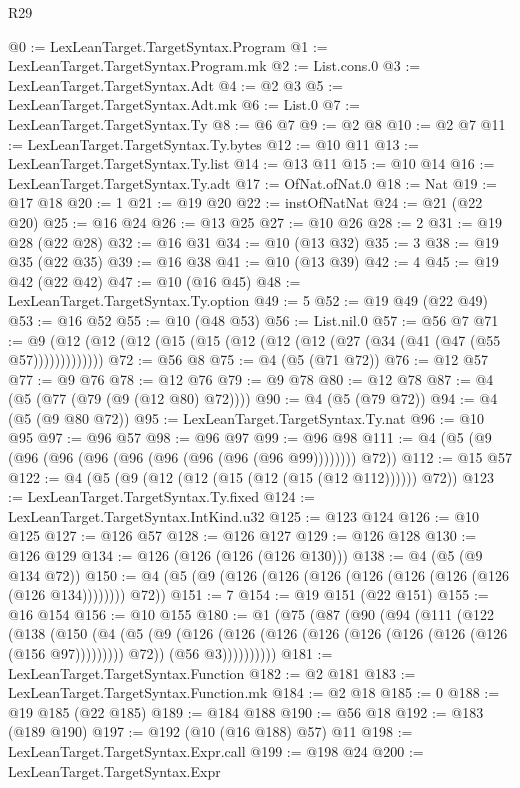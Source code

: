 \begin{lexlean}{R29}
\begin{coremodule}
@0 := LexLeanTarget.TargetSyntax.Program
@1 := LexLeanTarget.TargetSyntax.Program.mk
@2 := List.cons.{0}
@3 := LexLeanTarget.TargetSyntax.Adt
@4 := @2 @3
@5 := LexLeanTarget.TargetSyntax.Adt.mk
@6 := List.{0}
@7 := LexLeanTarget.TargetSyntax.Ty
@8 := @6 @7
@9 := @2 @8
@10 := @2 @7
@11 := LexLeanTarget.TargetSyntax.Ty.bytes
@12 := @10 @11
@13 := LexLeanTarget.TargetSyntax.Ty.list
@14 := @13 @11
@15 := @10 @14
@16 := LexLeanTarget.TargetSyntax.Ty.adt
@17 := OfNat.ofNat.{0}
@18 := Nat
@19 := @17 @18
@20 := 1
@21 := @19 @20
@22 := instOfNatNat
@24 := @21 (@22 @20)
@25 := @16 @24
@26 := @13 @25
@27 := @10 @26
@28 := 2
@31 := @19 @28 (@22 @28)
@32 := @16 @31
@34 := @10 (@13 @32)
@35 := 3
@38 := @19 @35 (@22 @35)
@39 := @16 @38
@41 := @10 (@13 @39)
@42 := 4
@45 := @19 @42 (@22 @42)
@47 := @10 (@16 @45)
@48 := LexLeanTarget.TargetSyntax.Ty.option
@49 := 5
@52 := @19 @49 (@22 @49)
@53 := @16 @52
@55 := @10 (@48 @53)
@56 := List.nil.{0}
@57 := @56 @7
@71 := @9 (@12 (@12 (@12 (@15 (@15 (@12 (@12 (@12 (@27 (@34 (@41 (@47 (@55 @57)))))))))))))
@72 := @56 @8
@75 := @4 (@5 (@71 @72))
@76 := @12 @57
@77 := @9 @76
@78 := @12 @76
@79 := @9 @78
@80 := @12 @78
@87 := @4 (@5 (@77 (@79 (@9 (@12 @80) @72))))
@90 := @4 (@5 (@79 @72))
@94 := @4 (@5 (@9 @80 @72))
@95 := LexLeanTarget.TargetSyntax.Ty.nat
@96 := @10 @95
@97 := @96 @57
@98 := @96 @97
@99 := @96 @98
@111 := @4 (@5 (@9 (@96 (@96 (@96 (@96 (@96 (@96 (@96 (@96 @99)))))))) @72))
@112 := @15 @57
@122 := @4 (@5 (@9 (@12 (@12 (@15 (@12 (@15 (@12 @112)))))) @72))
@123 := LexLeanTarget.TargetSyntax.Ty.fixed
@124 := LexLeanTarget.TargetSyntax.IntKind.u32
@125 := @123 @124
@126 := @10 @125
@127 := @126 @57
@128 := @126 @127
@129 := @126 @128
@130 := @126 @129
@134 := @126 (@126 (@126 (@126 @130)))
@138 := @4 (@5 (@9 @134 @72))
@150 := @4 (@5 (@9 (@126 (@126 (@126 (@126 (@126 (@126 (@126 (@126 @134)))))))) @72))
@151 := 7
@154 := @19 @151 (@22 @151)
@155 := @16 @154
@156 := @10 @155
@180 := @1
    (@75
      (@87
        (@90
          (@94
            (@111
              (@122
                (@138
                  (@150
                    (@4
                      (@5
                        (@9 (@126 (@126 (@126 (@126 (@126 (@126 (@126 (@126 (@156 @97))))))))) @72))
                      (@56 @3))))))))))
@181 := LexLeanTarget.TargetSyntax.Function
@182 := @2 @181
@183 := LexLeanTarget.TargetSyntax.Function.mk
@184 := @2 @18
@185 := 0
@188 := @19 @185 (@22 @185)
@189 := @184 @188
@190 := @56 @18
@192 := @183 (@189 @190)
@197 := @192 (@10 (@16 @188) @57) @11
@198 := LexLeanTarget.TargetSyntax.Expr.call
@199 := @198 @24
@200 := LexLeanTarget.TargetSyntax.Expr

\end{coremodule}
\end{lexlean}
